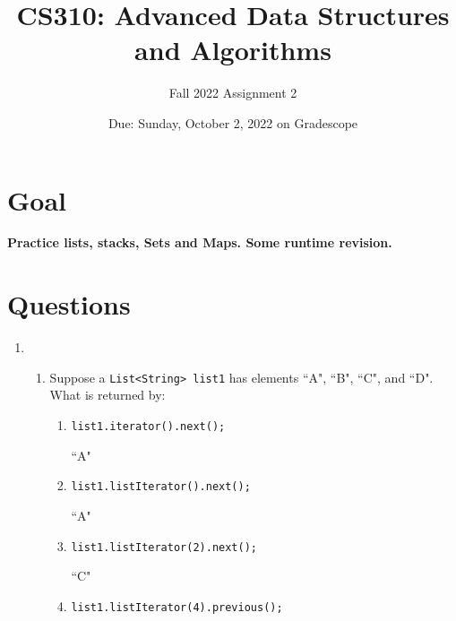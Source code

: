 \documentclass[letterpaper, 11pt]{article}
\title{CS310: Advanced Data Structures and Algorithms}
\author{Fall 2022 Assignment 2}
\date{Due: Sunday, October 2, 2022 on Gradescope}
\begin{document}
\maketitle

\section*{Goal}

\textbf{Practice lists, stacks, Sets and Maps. Some runtime revision.}

\section*{Questions}

\begin{enumerate}
    \item
    \begin{enumerate}
        \item Suppose a \texttt{List<String> list1} has elements ``A", ``B", ``C", and ``D". What is returned by:
        \begin{enumerate}[label={\arabic*}. ]
            \item \texttt{list1.iterator().next();}
            
            ``A"
            
            \item \texttt{list1.listIterator().next();}

            ``A"
            
            \item \texttt{list1.listIterator(2).next();}

            ``C"
            
            \item \texttt{list1.listIterator(4).previous();}


\end{enumerate}
\end{enumerate}
\end{enumerate}
\end{document}
